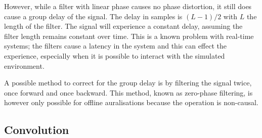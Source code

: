 However, while a filter with linear phase causes no phase distortion, it still
does cause a group delay of the signal. The delay in samples is $(L-1)/2$ with
$L$ the length of the filter. The signal will experience a constant delay,
assuming the filter length remains constant over time. This is a known problem
with real-time systems; the filters cause a latency in the system and this can
effect the experience, especially when it is possible to interact with the
simulated environment.

A possible method to correct for the group delay is by filtering the signal 
twice, once forward and once backward. This method, known as zero-phase 
filtering, is however only possible for offline auralisations because the 
operation is non-causal.






\subsection{Convolution}

